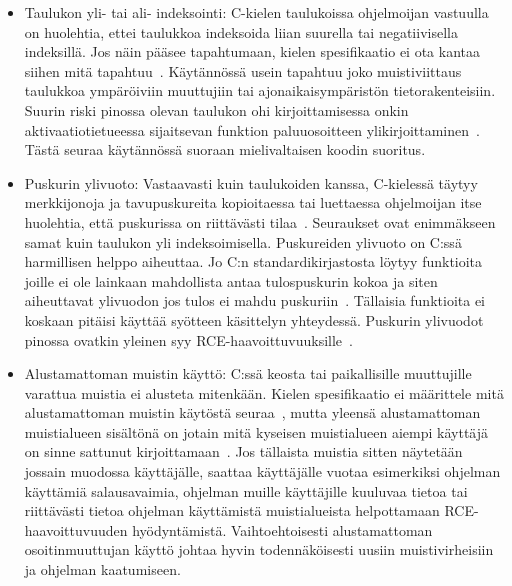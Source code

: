 \begin{itemize}
    \item Taulukon yli- tai ali- indeksointi: C-kielen taulukoissa ohjelmoijan vastuulla on huolehtia,
          ettei taulukkoa indeksoida liian suurella tai negatiivisella indeksillä.
          Jos näin pääsee tapahtumaan, kielen spesifikaatio ei ota kantaa siihen mitä tapahtuu~\cite[\S 6.5.6]{CSpec}.
          Käytännössä usein tapahtuu joko muistiviittaus taulukkoa ympäröiviin muuttujiin tai
          ajonaikaisympäristön tietorakenteisiin.
          Suurin riski pinossa olevan taulukon ohi kirjoittamisessa onkin aktivaatiotietueessa
          sijaitsevan funktion paluuosoitteen ylikirjoittaminen~\cite{StaticallyDetecting,SplintLCLint}.
          Tästä seuraa käytännössä suoraan mielivaltaisen koodin suoritus.
    \item Puskurin ylivuoto: Vastaavasti kuin taulukoiden kanssa,
          C-kielessä täytyy merkkijonoja ja tavupuskureita kopioitaessa tai luettaessa
          ohjelmoijan itse huolehtia, että puskurissa on riittävästi tilaa~\cite[\S 7.24.1]{CSpec}.
          Seuraukset ovat enimmäkseen samat kuin taulukon yli indeksoimisella.
          Puskureiden ylivuoto on C:ssä harmillisen helppo aiheuttaa.
          Jo C:n standardikirjastosta löytyy funktioita joille ei ole lainkaan mahdollista antaa tulospuskurin
          kokoa ja siten aiheuttavat ylivuodon jos tulos ei mahdu puskuriin~\cite{StaticallyDetecting,SplintLCLint}.
          Tällaisia funktioita ei koskaan pitäisi käyttää syötteen käsittelyn yhteydessä.
          Puskurin ylivuodot pinossa ovatkin yleinen syy RCE-haavoittuvuuksille~\cite{SplintLCLint}.
    \item Alustamattoman muistin käyttö: C:ssä keosta tai paikallisille muuttujille
          varattua muistia ei alusteta mitenkään.
          Kielen spesifikaatio ei määrittele mitä alustamattoman muistin käytöstä seuraa~\cite[\S 6.3.2.1 ja \S 7.22.3.4]{CSpec},
          mutta yleensä alustamattoman muistialueen sisältönä on jotain mitä kyseisen muistialueen aiempi käyttäjä on
          sinne sattunut kirjoittamaan~\cite{SecurityRootOfTheProblem}.
%
          Jos tällaista muistia sitten näytetään jossain muodossa käyttäjälle,
          saattaa käyttäjälle vuotaa esimerkiksi ohjelman käyttämiä salausavaimia,
          ohjelman muille käyttäjille kuuluvaa tietoa tai
          riittävästi tietoa ohjelman käyttämistä muistialueista helpottamaan RCE-haavoittuvuuden hyödyntämistä.
          Vaihtoehtoisesti alustamattoman osoitinmuuttujan käyttö johtaa hyvin todennäköisesti uusiin muistivirheisiin
          ja ohjelman kaatumiseen.

\end{itemize}
